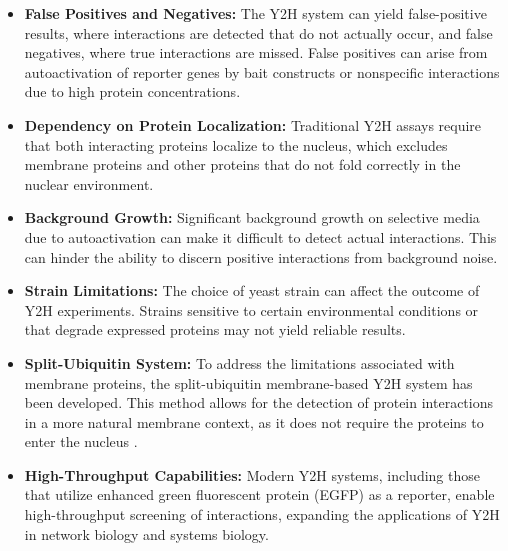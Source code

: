 \documentclass{article}
\newcounter{subsubsubsection}[subsubsection]
\begin{document}
\begin{itemize}
    \item \textbf{False Positives and Negatives:} 
    The Y2H system can yield false-positive results, where interactions are detected that do not actually occur, and false negatives, where true interactions are missed. False positives can arise from autoactivation of reporter genes by bait constructs or nonspecific interactions due to high protein concentrations.

    \item \textbf{Dependency on Protein Localization:}
    Traditional Y2H assays require that both interacting proteins localize to the nucleus, which excludes membrane proteins and other proteins that do not fold correctly in the nuclear environment.

    \item \textbf{Background Growth:}
    Significant background growth on selective media due to autoactivation can make it difficult to detect actual interactions. This can hinder the ability to discern positive interactions from background noise.

    \item \textbf{Strain Limitations:}
    The choice of yeast strain can affect the outcome of Y2H experiments. Strains sensitive to certain environmental conditions or that degrade expressed proteins may not yield reliable results.
\end{itemize}


\begin{itemize}
    \item \textbf{Split-Ubiquitin System:}
    To address the limitations associated with membrane proteins, the split-ubiquitin membrane-based Y2H system has been developed. This method allows for the detection of protein interactions in a more natural membrane context, as it does not require the proteins to enter the nucleus \cite{stagljar1998genetic}.

    \item \textbf{High-Throughput Capabilities:}
    Modern Y2H systems, including those that utilize enhanced green fluorescent protein (EGFP) as a reporter, enable high-throughput screening of interactions, expanding the applications of Y2H in network biology and systems biology.

\end{itemize}
\end{document}
